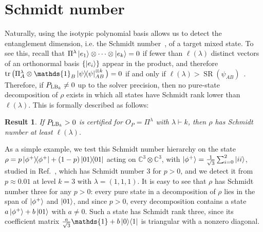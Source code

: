 \documentclass[11pt,a4paper]{report}
\newcommand{\one}{\mathds{1}}
\newcommand{\I}{\one}
\renewcommand{\a}{\alpha}
\newcommand{\C}{\mathds{C}}
\newtheorem{result}[theorem]{Result}
\newcounter{reptag}
\newif\iftags \tagsfalse   %
\newcommand{\reptagbox}[3]{\iftags\par\smallskip\noindent\refstepcounter{reptag}%
  \fcolorbox{#1}{#1!7}{\parbox{\dimexpr\linewidth-2\fboxsep-2\fboxrule\relax}{\small
  \textcolor{#1}{\textbf{[\thereptag]\ #2.}}\ #3}}\par\smallskip\fi}
\newcommand{\deeper}[1]{\reptagbox{tagP}{Deeper proof}{#1}}
\newcommand{\addition}[1]{\reptagbox{tagN}{New content}{#1}}
\begin{document}
\section{Schmidt number}\label{sec:schmidtNumber}
Naturally, using the isotypic polynomial basis allows us to detect the entanglement dimension, i.e. the Schmidt number~\cite{Terhal_2000}, of a target mixed state. To see this, recall that $\Pi^\lambda\ket{e_1}\otimes\dots\otimes\ket{e_k}=0$ if fewer than $\ell(\lambda)$ distinct vectors of an orthonormal basis $\{\ket{e_i}\}$ appear in the product, and therefore $\tr\big(\Pi^\lambda_A\otimes\one_B \dyad{\psi}_{AB}^{\otimes k}\big) = 0$ if and only if $\ell(\lambda) > \operatorname{SR}(\psi_{AB})$~\cite{Christandl_2005,lovitz2026TreeTNtest}.
Therefore, if $P_{{\rm LB}_k}\neq 0$ up to the solver precision, then no pure-state decomposition of $\rho$ exists in which all states have Schmidt rank lower than $\ell(\lambda)$. This is formally described as follows:
\begin{result}
   If $P_{{\rm LB}_k}> 0$ is certified for $O_P=\Pi^\lambda$ with $\lambda\vdash k$, then $\rho$ has Schmidt number at least $\ell(\lambda)$.
\end{result}
As a simple example, we test this Schmidt number hierarchy on the state $ \rho = p \dyad{\phi^+} + (1-p)\dyad{01}$ acting on $\C^3 \otimes \C^3$, with $\ket{\phi^+}=\frac{1}{\sqrt3}\sum_{i=0}^{2}\ket{ii}$, studied in Ref.~\cite{Tavakoli_2024}, which has Schmidt number $3$ for $p > 0$, and we detect it from $p\approx 0.01$ at level $k=3$ with $\lambda = (1,1,1)$.
It is easy to see that $\rho$ has Schmidt number three for any $p > 0$: every pure state in a decomposition of $\rho$ lies in the span of $\ket{\phi^+}$ and $\ket{01}$, and since $p>0$, every decomposition contains a state $a\ket{\phi^+}+b\ket{01}$ with $a\neq0$. Such a state has Schmidt rank three, since its coefficient matrix $\tfrac{a}{\sqrt3}\I+b\ket{0}\!\bra{1}$ is triangular with a nonzero diagonal.
\deeper{Prove the Schmidt-number property rather than citing it (a few lines, can stay here): if $\ket\psi$ has Schmidt rank $r$, then $\rho_A^{\otimes k}$ is supported on $(\C^r)^{\otimes k}$, where $\Pi^\lambda=0$ for $\ell(\lambda)>r$; conversely, for $\ell(\lambda)\le r$, $s_\lambda(\a)>0$, since $s_\lambda=\sum_\mu K_{\lambda\mu}m_\mu$ with $K_{\lambda\mu}\ge0$, $K_{\lambda\lambda}=1$, and $m_\lambda(\a)>0$ when $r$ entries of $\a$ are positive.}
\addition{The first phase of the internship (May--September, \texttt{QuantifyingSchmidtNumber}) fits here: the Schmidt-number and $E_t$ bounds, the state sweeps, the upper bounds from the September extraction (the \texttt{HANDOVER.md} table, e.g.\ isotropic $F=0.8$ tight at $\lambda=(1,1,1)$ and $(1,1)$), and how they compare with this witness. One or two pages here, with the full tables in an appendix, show the path that led to the paper.}
\end{document}
